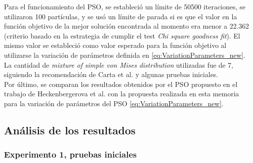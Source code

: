 Para el funcionamiento del PSO, se estableció un límite de 50500 iteraciones, se utilizaron 100 partículas, y se usó un límite de parada si es que el valor en la función objetivo de la mejor solución encontrada al momento era menor a 22.362 (criterio basado en la estrategia de cumplir el test \emph{Chi square goodness fit}). El mismo valor se estableció como valor esperado para la función objetivo al utilizarse la variación de parámetros definida en \ref{eq:VariationParameters_new}. La cantidad de \emph{mixture of simple von Mises distribution} utilizadas fue de 7, siguiendo la recomendación de Carta et al. \cite{Carta07} y algunas pruebas iniciales.\\

Por último, se comparan los resultados obtenidos por el PSO propuesto en el trabajo de Heckenbergerova et al. \cite{Heckenbergerova15} con la propuesta realizada en esta memoria para la variación de parámetros del PSO \ref{eq:VariationParameters_new}.

\subsection{Análisis de los resultados}
\subsubsection{Experimento 1, pruebas iniciales}

